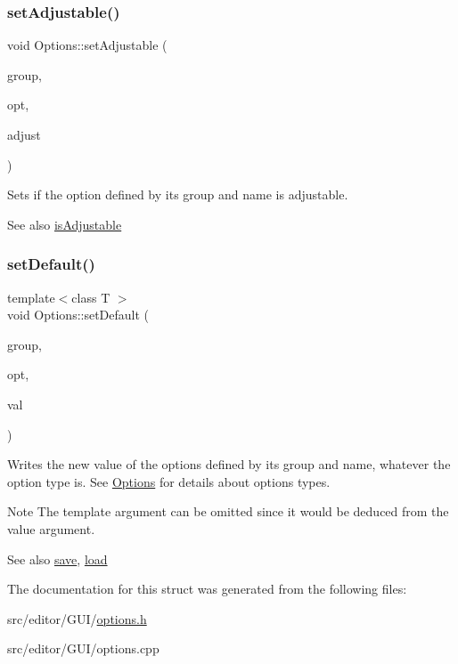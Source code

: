 \subsubsection{\texorpdfstring{set\+Adjustable()}{setAdjustable()}}
{\footnotesize\ttfamily void Options\+::set\+Adjustable (\begin{DoxyParamCaption}\item[{Q\+String}]{group,  }\item[{Q\+String}]{opt,  }\item[{bool}]{adjust }\end{DoxyParamCaption})}

Sets if the option defined by its group and name is adjustable.

\begin{DoxySeeAlso}{See also}
\hyperlink{struct_options_a1188a188db82d70c96af44679d2cbbf9}{is\+Adjustable} 
\end{DoxySeeAlso}
\hypertarget{struct_options_ab1d167bd93bce7dd453fcbb93acf12e4}{}\label{struct_options_ab1d167bd93bce7dd453fcbb93acf12e4} 
\subsubsection{\texorpdfstring{set\+Default()}{setDefault()}}
{\footnotesize\ttfamily template$<$class T $>$ \\
void Options\+::set\+Default (\begin{DoxyParamCaption}\item[{Q\+String}]{group,  }\item[{Q\+String}]{opt,  }\item[{T}]{val }\end{DoxyParamCaption})\hspace{0.3cm}{\ttfamily [inline]}}

Writes the new value of the options defined by its group and name, whatever the option type is. See \hyperlink{struct_options}{Options} for details about options types.

\begin{DoxyNote}{Note}
The template argument can be omitted since it would be deduced from the value argument.
\end{DoxyNote}
\begin{DoxySeeAlso}{See also}
\hyperlink{struct_options_ad20146ff9544f6229bb1696ea5bf643d}{save}, \hyperlink{struct_options_ada32d485296bd6ba73a1d95bd6260c1a}{load} 
\end{DoxySeeAlso}


The documentation for this struct was generated from the following files\+:\begin{DoxyCompactItemize}
\item 
src/editor/\+G\+U\+I/\hyperlink{options_8h}{options.\+h}\item 
src/editor/\+G\+U\+I/options.\+cpp\end{DoxyCompactItemize}
